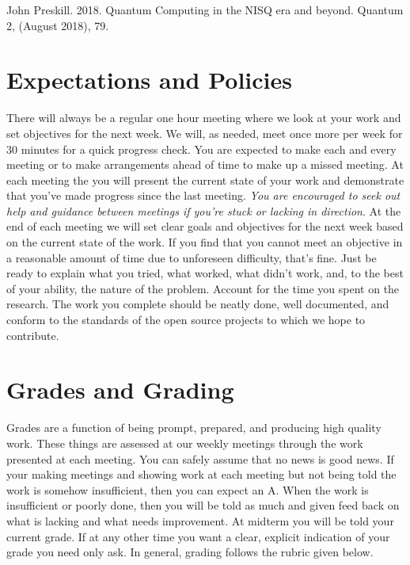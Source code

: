 \documentclass[10pt]{article}
\begin{document}
\vspace{.05in}
\noindent
[6]John Preskill. 2018. Quantum Computing in the NISQ era and beyond. Quantum 2, (August 2018), 79.


\section{Expectations and Policies}

There will always be a regular one hour meeting where we look at your work and set objectives for the next week. We will, as needed, meet once more per week for 30 minutes for a quick progress check. You are expected to make each and every meeting or to make arrangements ahead of time to make up a missed meeting. At each meeting the you will present the current state of your work and demonstrate that you've made progress since the last meeting. \textit{You are encouraged to seek out help and guidance between meetings if you're stuck or lacking in direction}. At the end of each meeting we will set clear goals and objectives for the next week based on the current state of the work.  If you find that you cannot meet an objective in a reasonable amount of time due to unforeseen difficulty, that's fine. Just be ready to explain what you tried, what worked, what didn't work, and, to the best of your ability, the nature of the problem. Account for the time you spent on the research. The work you complete should be neatly done, well documented, and conform to the standards of the open source projects to which we hope to contribute.

\section{Grades and Grading}

Grades are a function of being prompt, prepared, and producing high quality work. These things are assessed at our weekly meetings through the work presented at each meeting. You can safely assume that no news is good news. If your making meetings and showing work at each meeting but not being told the work is somehow insufficient, then you can expect an A. When the work is insufficient or poorly done, then you will be told as much and given feed back on what is lacking and what needs improvement. At midterm you will be told your current grade. If at any other time you want a clear, explicit indication of your grade you need only ask. In general, grading follows the rubric given below.
\end{document}
